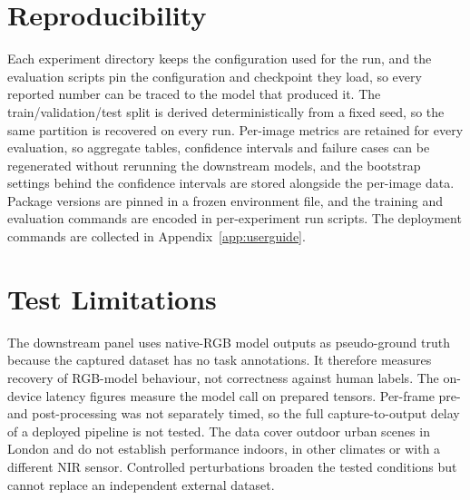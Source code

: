 \section{Reproducibility}
\label{sec:test_repro}

Each experiment directory keeps the configuration used for the run, and the evaluation scripts pin the configuration and checkpoint they load, so every reported number can be traced to the model that produced it. The train/validation/test split is derived deterministically from a fixed seed, so the same partition is recovered on every run. Per-image metrics are retained for every evaluation, so aggregate tables, confidence intervals and failure cases can be regenerated without rerunning the downstream models, and the bootstrap settings behind the confidence intervals are stored alongside the per-image data. Package versions are pinned in a frozen environment file, and the training and evaluation commands are encoded in per-experiment run scripts. The deployment commands are collected in Appendix~\ref{app:userguide}.

\section{Test Limitations}
\label{sec:test_limitations}

The downstream panel uses native-RGB model outputs as pseudo-ground truth because the captured dataset has no task annotations. It therefore measures recovery of RGB-model behaviour, not correctness against human labels. The on-device latency figures measure the model call on prepared tensors. Per-frame pre- and post-processing was not separately timed, so the full capture-to-output delay of a deployed pipeline is not tested. The data cover outdoor urban scenes in London and do not establish performance indoors, in other climates or with a different NIR sensor. Controlled perturbations broaden the tested conditions but cannot replace an independent external dataset.
